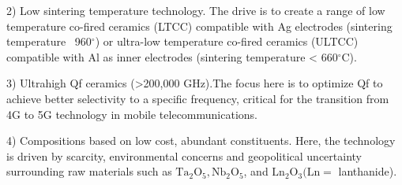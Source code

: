 \documentclass[a4paper,14pt]{extreport}
\begin{document}
2) Low sintering temperature technology. The drive is to create a range of low
temperature co-fired ceramics (LTCC) compatible with Ag electrodes
(sintering temperature ~960$^{\circ}$) or ultra-low temperature co-fired ceramics
(ULTCC) compatible with Al as inner electrodes (sintering temperature < 660$^{\circ}$C). 

3) Ultrahigh Qf ceramics (>200,000 GHz).The focus here is to optimize Qf to 
achieve better selectivity to a specific frequency, critical for the transition from
4G to 5G technology in mobile telecommunications. 

4) Compositions based on low cost, abundant constituents. Here, the technology
is driven by scarcity, environmental concerns and geopolitical uncertainty
surrounding raw materials such as $\mathrm{Ta}_{2} \mathrm{O}_{5}, \mathrm{Nb}_{2} \mathrm{O}_{5}$, and $\mathrm{Ln}_{2} \mathrm{O}_{3}(\mathrm{Ln}=$ lanthanide).\\
\end{document}
